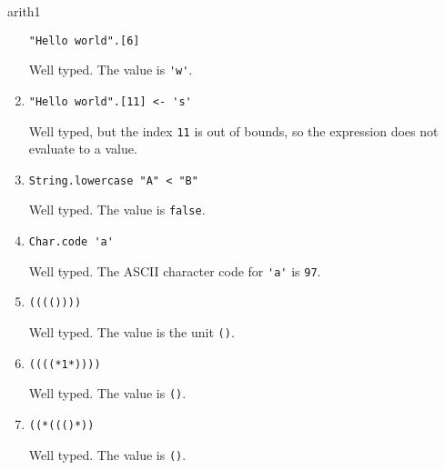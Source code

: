 \begin{exercise}{arith1}
\begin{enumerate}
\lstinline!"Hello world".[6]!

\begin{answer}\ifanswers
Well typed.  The value is \hbox{\lstinline/'w'/}.
\fi\end{answer}

\item

\lstinline!"Hello world".[11] <- 's'!

\begin{answer}\ifanswers
Well typed, but the index \hbox{\lstinline/11/} is out of bounds,
so the expression does not evaluate to a value.
\fi\end{answer}

\item

\lstinline!String.lowercase "A" < "B"!

\begin{answer}\ifanswers
Well typed.  The value is \hbox{\lstinline/false/}.
\fi\end{answer}

\item

\lstinline!Char.code 'a'!

\begin{answer}\ifanswers
Well typed.  The ASCII character code for \hbox{\lstinline/'a'/} is
\hbox{\lstinline/97/}.
\fi\end{answer}

\item \lstinline!(((())))!

\begin{answer}\ifanswers
Well typed.  The value is the unit \hbox{\lstinline/()/}.
\fi\end{answer}

\item \verb!((((*1*))))!

\begin{answer}\ifanswers
Well typed.  The value is \hbox{\lstinline/()/}.
\fi\end{answer}

\item \verb!((*((()*))!

\begin{answer}\ifanswers
Well typed.  The value is \hbox{\lstinline/()/}.
\fi\end{answer}
\end{enumerate}
\end{exercise}

